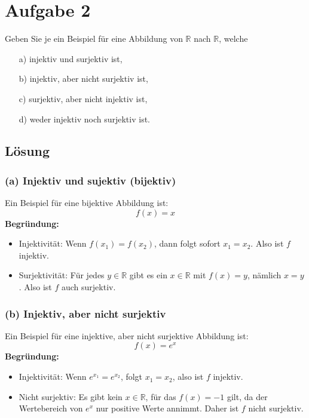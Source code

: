 \documentclass[11pt]{article}
\begin{document}
\section*{Aufgabe 2}

Geben Sie je ein Beispiel für eine Abbildung von \( \mathbb{R} \) nach \( \mathbb{R} \), welche

\begin{itemize}
    \item[a)] injektiv und surjektiv ist,
    \item[b)] injektiv, aber nicht surjektiv ist,
    \item[c)] surjektiv, aber nicht injektiv ist,
    \item[d)] weder injektiv noch surjektiv ist.
\end{itemize}

\subsection*{Lösung}

\subsubsection*{(a) Injektiv und sujektiv (bijektiv)}

Ein Beispiel für eine bijektive Abbildung ist:
\[
f(x) = x
\]
\textbf{Begründung:}
\begin{itemize}
    \item Injektivität: Wenn \( f(x_1) = f(x_2) \), dann folgt sofort \( x_1 = x_2 \). Also ist \( f \) injektiv.
    \item Surjektivität: Für jedes \( y \in \mathbb{R} \) gibt es ein \( x \in \mathbb{R} \) mit \( f(x) = y \), nämlich \( x = y \). Also ist \( f \) auch surjektiv.
\end{itemize}

\subsubsection*{(b) Injektiv, aber nicht surjektiv}

Ein Beispiel für eine injektive, aber nicht surjektive Abbildung ist:
\[
f(x) = e^x
\]
\textbf{Begründung:}
\begin{itemize}
    \item Injektivität: Wenn \( e^{x_1} = e^{x_2} \), folgt \( x_1 = x_2 \), also ist \( f \) injektiv.
    \item Nicht surjektiv: Es gibt kein \( x \in \mathbb{R} \), für das \( f(x) = -1 \) gilt, da der Wertebereich von \( e^x \) nur positive Werte annimmt. Daher ist \( f \) nicht surjektiv.
\end{itemize}
\end{document}
